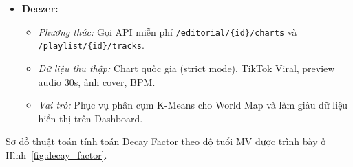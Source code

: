 \documentclass[12pt,a4paper]{report}
\begin{document}
\begin{itemize}[leftmargin=*]
    \item \textbf{Deezer:}
    \begin{itemize}
        \item \textit{Phương thức:} Gọi API miễn phí \texttt{/editorial/\{id\}/\allowbreak{}charts} và \texttt{/playlist/\{id\}/\allowbreak{}tracks}.
        \item \textit{Dữ liệu thu thập:} Chart quốc gia (strict mode), TikTok Viral, preview audio 30s, ảnh cover, BPM.
        \item \textit{Vai trò:} Phục vụ phân cụm K-Means cho World Map và làm giàu dữ liệu hiển thị trên Dashboard.
    \end{itemize}
\end{itemize}

Sơ đồ thuật toán tính toán Decay Factor theo độ tuổi MV được trình bày ở Hình~\ref{fig:decay_factor}.
\end{document}
